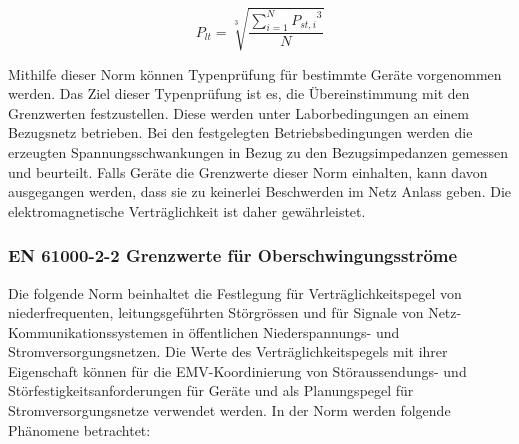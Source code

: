 \begin{appendix}
\begin{equation}\label{eq:Plt}
P_{lt} = {\sqrt[3]{\frac{\sum_{i=1}^{N} {P_{st,i}}^3}{N}}}
\end{equation}

Mithilfe dieser Norm können Typenprüfung für bestimmte Geräte vorgenommen werden. Das Ziel dieser Typenprüfung ist es, die Übereinstimmung mit den Grenzwerten festzustellen. Diese werden unter Laborbedingungen an einem Bezugsnetz betrieben. Bei den festgelegten Betriebsbedingungen werden die erzeugten Spannungsschwankungen in Bezug zu den Bezugsimpedanzen gemessen und beurteilt. Falls Geräte die Grenzwerte dieser Norm einhalten, kann davon ausgegangen werden, dass sie zu keinerlei Beschwerden im Netz Anlass geben. Die elektromagnetische Verträglichkeit ist daher gewährleistet. 


\subsubsection{EN 61000-2-2 Grenzwerte für Oberschwingungsströme}

Die folgende Norm beinhaltet die Festlegung für Verträglichkeitspegel von niederfrequenten, leitungsgeführten Störgrössen und für Signale von Netz-Kommunikationssystemen in öffentlichen Niederspannungs- und Stromversorgungsnetzen. Die Werte des Verträglichkeitspegels mit ihrer Eigenschaft können für die EMV-Koordinierung von Störaussendungs- und Störfestigkeitsanforderungen für Geräte und als Planungspegel für Stromversorgungsnetze verwendet werden. In der Norm werden folgende Phänomene betrachtet:


\end{appendix}
